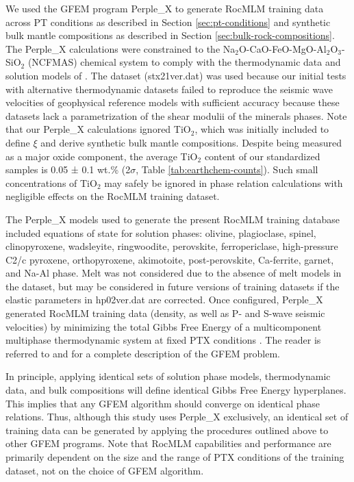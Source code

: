\documentclass[draft,linenumbers]{agujournal2018}
\begin{document}
We used the GFEM program Perple\_X \citep[version 7.0.9,][]{connolly2009} to generate RocMLM training data across PT conditions as described in Section \ref{sec:pt-conditions} and synthetic bulk mantle compositions as described in Section \ref{sec:bulk-rock-compositions}. The Perple\_X calculations were constrained to the Na\(_2\)O-CaO-FeO-MgO-Al\(_2\)O\(_3\)-SiO\(_2\) (NCFMAS) chemical system to comply with the thermodynamic data and solution models of \citet{stixrude2022}. The \citet{stixrude2022} dataset (stx21ver.dat) was used because our initial tests with alternative thermodynamic datasets \citep[hp02ver.dat and hp633ver.dat,][]{connolly2002, holland2001, holland2018} failed to reproduce the seismic wave velocities of geophysical reference models \citep[PREM and STW105,][]{dziewonski1981, kustowski2008} with sufficient accuracy because these datasets lack a parametrization of the shear modulii of the minerals phases. Note that our Perple\_X calculations ignored TiO\(_2\), which was initially included to define \(\xi\) and derive synthetic bulk mantle compositions. Despite being measured as a major oxide component, the average TiO\(_2\) content of our standardized samples is 0.05 ± 0.1 wt.\% (2\(\sigma\), Table \ref{tab:earthchem-counts}). Such small concentrations of TiO\(_2\) may safely be ignored in phase relation calculations with negligible effects on the RocMLM training dataset.

The Perple\_X models used to generate the present RocMLM training database included equations of state for solution phases: olivine, plagioclase, spinel, clinopyroxene, wadsleyite, ringwoodite, perovskite, ferropericlase, high-pressure C2/c pyroxene, orthopyroxene, akimotoite, post-perovskite, Ca-ferrite, garnet, and Na-Al phase. Melt was not considered due to the absence of melt models in the \citet{stixrude2022} dataset, but may be considered in future versions of training datasets if the elastic parameters in hp02ver.dat are corrected. Once configured, Perple\_X generated RocMLM training data (density, as well as P- and S-wave seismic velocities) by minimizing the total Gibbs Free Energy of a multicomponent multiphase thermodynamic system at fixed PTX conditions \citep{gibbs1878, spear1993}. The reader is referred to \citet{connolly2009} and \citet{riel2022} for a complete description of the GFEM problem.

In principle, applying identical sets of solution phase models, thermodynamic data, and bulk compositions will define identical Gibbs Free Energy hyperplanes. This implies that any GFEM algorithm should converge on identical phase relations. Thus, although this study uses Perple\_X exclusively, an identical set of training data can be generated by applying the procedures outlined above to other GFEM programs. Note that RocMLM capabilities and performance are primarily dependent on the size and the range of PTX conditions of the training dataset, not on the choice of GFEM algorithm.
\end{document}
